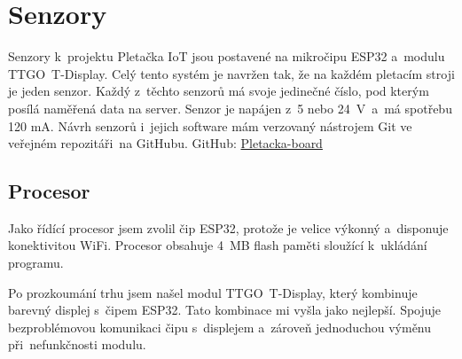 \chapter{Senzory}

Senzory k~projektu Pletačka IoT jsou postavené na mikročipu ESP32 a~modulu TTGO~T-Display.
Celý tento systém je navržen tak, že na každém pletacím stroji je jeden senzor.
Každý z~těchto senzorů má svoje jedinečné číslo, pod kterým posílá naměřená data na server.
Senzor je napájen z~5 nebo 24~V~a~má spotřebu 120 mA.
Návrh senzorů i~jejich software mám verzovaný nástrojem Git ve veřejném repozitáři~na GitHubu.\newline
GitHub: \href{https://github.com/Pletacka-IoT/Pletacka-board}{Pletacka-board}\cite{PL_BOARD}

\section{Procesor}
Jako řídící procesor jsem zvolil čip ESP32, protože je velice výkonný a~disponuje konektivitou WiFi.
Procesor obsahuje 4~MB flash paměti sloužící k~uk\-lá\-dá\-ní programu.

Po prozkoumání trhu jsem našel modul TTGO~T-Display, který kombinuje barevný displej s~čipem ESP32.
Tato kombinace mi vyšla jako nejlepší. 
Spojuje bezproblémovou komunikaci čipu s~displejem a~zároveň jednoduchou výměnu při~nefunkčnosti modulu.


